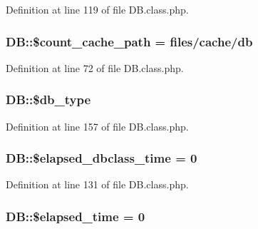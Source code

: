 Definition at line 119 of file D\+B.\+class.\+php.

\hypertarget{classDB_aca72b9b3a39bb5e5d2e444f20db2c6bb}{}
\subsubsection[{\$count\+\_\+cache\+\_\+path}]{\setlength{\rightskip}{0pt plus 5cm}D\+B\+::\$count\+\_\+cache\+\_\+path = \textquotesingle{}files/cache/db\textquotesingle{}}\label{classDB_aca72b9b3a39bb5e5d2e444f20db2c6bb}


Definition at line 72 of file D\+B.\+class.\+php.

\hypertarget{classDB_a78868b4c2301aa813d9e2d481424f1e8}{}
\subsubsection[{\$db\+\_\+type}]{\setlength{\rightskip}{0pt plus 5cm}D\+B\+::\$db\+\_\+type}\label{classDB_a78868b4c2301aa813d9e2d481424f1e8}


Definition at line 157 of file D\+B.\+class.\+php.

\hypertarget{classDB_a0483c1bfe18fa5e8bbe7915f9c8187a7}{}
\subsubsection[{\$elapsed\+\_\+dbclass\+\_\+time}]{\setlength{\rightskip}{0pt plus 5cm}D\+B\+::\$elapsed\+\_\+dbclass\+\_\+time = 0}\label{classDB_a0483c1bfe18fa5e8bbe7915f9c8187a7}


Definition at line 131 of file D\+B.\+class.\+php.

\hypertarget{classDB_af5a3fdd4e0078a185dac8c2727fb4f2c}{}
\subsubsection[{\$elapsed\+\_\+time}]{\setlength{\rightskip}{0pt plus 5cm}D\+B\+::\$elapsed\+\_\+time = 0}\label{classDB_af5a3fdd4e0078a185dac8c2727fb4f2c}


